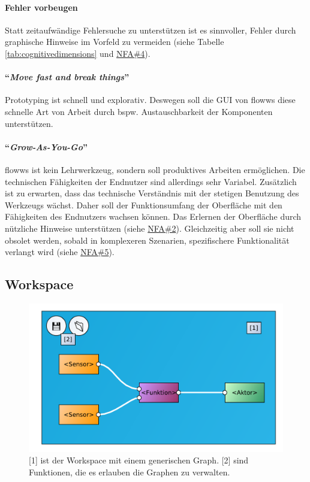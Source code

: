 \paragraph{Fehler vorbeugen}\label{par:fehlervorbeugen} Statt zeitaufwändige Fehlersuche zu unterstützen ist es sinnvoller, Fehler durch graphische Hinweise im Vorfeld zu vermeiden (siehe Tabelle \ref{tab:cognitivedimensions} und  \hyperref[tab:NFA4]{NFA\#4}).

\paragraph{"`\textit{Move fast and break things}"'}\label{par:movefast} Prototyping ist schnell und explorativ. Deswegen soll die \ac{GUI} von flowws diese schnelle Art von Arbeit durch bspw. Austauschbarkeit der Komponenten unterstützen.

\paragraph{"`\textit{Grow-As-You-Go}"'}\label{par:growasyougo} flowws ist kein Lehrwerkzeug, sondern soll produktives Arbeiten ermöglichen. Die technischen Fähigkeiten der Endnutzer sind allerdings sehr Variabel. Zusätzlich ist zu erwarten, dass das technische Verständnis mit der stetigen Benutzung des Werkzeugs wächst. Daher soll der Funktionsumfang der Oberfläche mit den Fähigkeiten des Endnutzers wachsen können. Das Erlernen der Oberfläche durch nützliche Hinweise unterstützen (siehe \hyperref[tab:NFA2]{NFA\#2}). Gleichzeitig aber soll sie nicht obsolet werden, sobald in komplexeren Szenarien, spezifischere Funktionalität verlangt wird (siehe  \hyperref[tab:NFA5]{NFA\#5}).


\subsection{Workspace}
\begin{figure}[h]
  \centering
  \includegraphics[width=.75\textwidth]{bilder/chapter4/chapter4_3/workspace.pdf}
  \caption{[1] ist der Workspace mit einem generischen Graph. [2] sind Funktionen, die es erlauben die Graphen zu verwalten.}
  \label{fig:workspace}
\end{figure}


